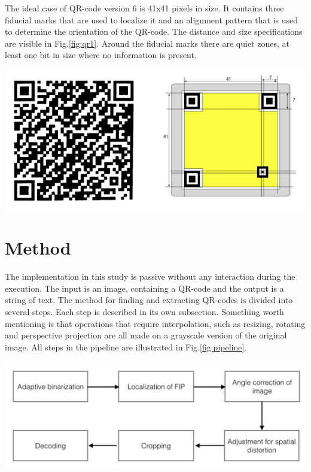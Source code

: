 \documentclass[12pt,a4paper]{article}
\newenvironment{Figure}
  {\par\medskip\noindent\minipage{\linewidth}}
  {\endminipage\par\medskip}
\begin{document}
The ideal case of QR-code version 6 is 41x41 pixels in size. It contains three fiducial marks that are used to localize it and an alignment pattern that is used to determine the orientation of the QR-code. The distance and size specifications are visible in Fig.\ref{fig:qr1}. Around the fiducial marks there are quiet zones, at least one bit in size where no information is present. 
\begin{Figure}
  \centering
    \includegraphics[width=0.9\linewidth]{./img/qr1.png}
\end{Figure}

\section{Method}
The implementation in this study is passive without any interaction during the execution. The input is an image, containing a QR-code and the output is a string of text. The method for finding and extracting QR-codes is divided into several steps. Each step is described in its own subsection. Something worth mentioning is that operations that require interpolation, such as resizing, rotating and perspective projection are all made on a grayscale version of the original image. All steps in the pipeline are illustrated in Fig.\ref{fig:pipeline}. 
\begin{Figure}
  \centering
    \includegraphics[width=1\linewidth]{./img/pipeline.png}
\end{Figure}
\end{document}
